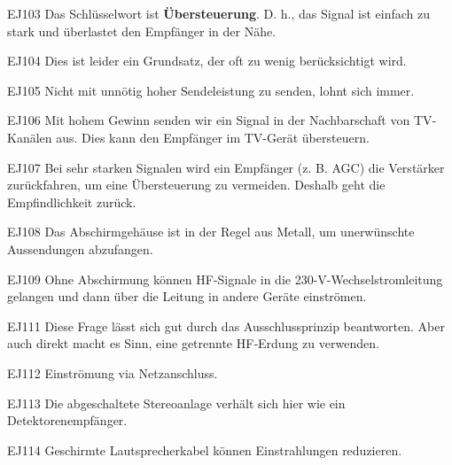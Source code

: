 \begin{sol}{EJ103}
Das Schlüsselwort ist \textbf{Übersteuerung}. D. h., das Signal ist einfach zu stark und überlastet den Empfänger in der Nähe.
\end{sol}


\begin{sol}{EJ104}
Dies ist leider ein Grundsatz, der oft zu wenig berücksichtigt wird. 
\end{sol}

\begin{sol}{EJ105}
Nicht mit unnötig hoher Sendeleistung zu senden, lohnt sich immer.
\end{sol}

\begin{sol}{EJ106}
Mit hohem Gewinn senden wir ein Signal in der Nachbarschaft von TV-Kanälen aus. Dies kann den Empfänger im TV-Gerät übersteuern.
\end{sol}

\begin{sol}{EJ107}
Bei sehr starken Signalen wird ein Empfänger (z. B. AGC) die Verstärker zurückfahren, um eine Übersteuerung zu vermeiden.
Deshalb geht die Empfindlichkeit zurück.
\end{sol}

\begin{sol}{EJ108}
Das Abschirmgehäuse ist in der Regel aus Metall, um unerwünschte Aussendungen abzufangen.
\end{sol}

\begin{sol}{EJ109}
Ohne Abschirmung können HF-Signale in die 230-V-Wechselstromleitung gelangen und dann über die Leitung in andere Geräte einströmen.
\end{sol}


\begin{sol}{EJ111}
Diese Frage lässt sich gut durch das Ausschlussprinzip beantworten. Aber auch direkt macht es Sinn, eine getrennte HF‑Erdung zu verwenden.
\end{sol}

\begin{sol}{EJ112}
Einströmung via Netzanschluss.
\end{sol}

\begin{sol}{EJ113}
Die abgeschaltete Stereoanlage verhält sich hier wie ein Detektorenempfänger. 
\end{sol}

\begin{sol}{EJ114}
Geschirmte Lautsprecherkabel können Einstrahlungen reduzieren.
\end{sol}

